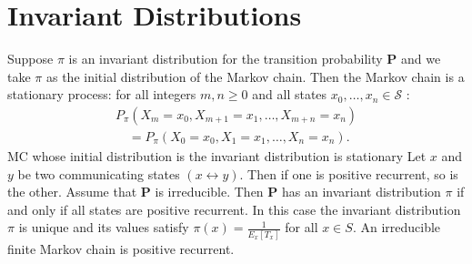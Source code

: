 \documentclass{report}
\begin{document}
  \section{Invariant Distributions}%
     {
      Suppose $\pi$ is an invariant distribution for the transition probability $\mathbf{P}$ and we take $\pi$ as the initial distribution of the Markov chain. Then the Markov chain is a stationary process: for all integers $m, n \geq 0$ and all states $x_0, \ldots, x_n \in \mathcal{S}$ :
$$
\begin{array}{r}
P_\pi\left(X_m=x_0, X_{m+1}=x_1, \ldots, X_{m+n}=x_n\right) \\
\quad=P_\pi\left(X_0=x_0, X_1=x_1, \ldots, X_n=x_n\right) .
\end{array}
$$
    }
     {
      MC whose initial distribution is the invariant distribution
      is stationary
    }
     {
      Let $x$ and $y$ be two communicating states $(x \longleftrightarrow y)$. Then if one is positive recurrent, so is the other.
    }
     {
       Assume that $\mathbf{P}$ is irreducible. Then $\mathbf{P}$ has an
       invariant distribution $\pi$ if and only if all states are
       positive recurrent. In this case the invariant distribution $\pi$
       is unique and its values satisfy
       $\pi(x)=\frac{1}{E_x\left[T_x\right]}$ for all $x \in S$.
    }
     {
      An irreducible finite Markov chain is positive recurrent.
    }
\end{document}
